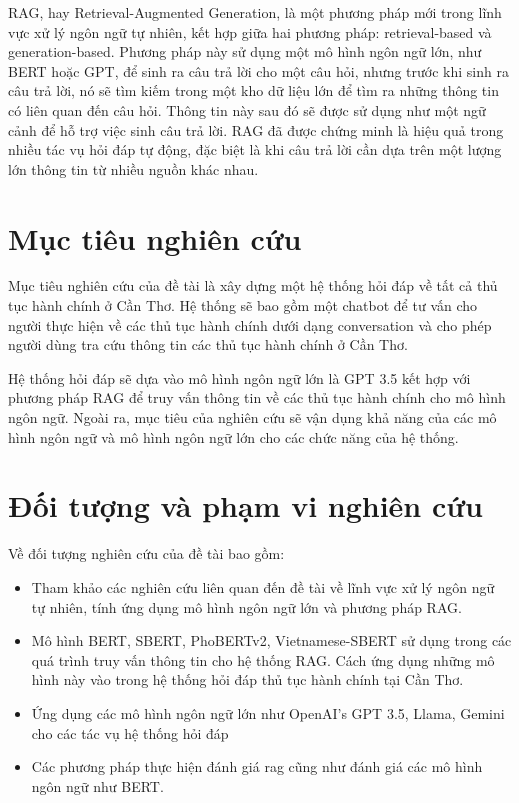 \documentclass[a4paper, 12pt, openany]{book}
\begin{document}
RAG, hay Retrieval-Augmented Generation, là một phương pháp mới trong lĩnh vực xử lý ngôn ngữ tự nhiên, kết hợp giữa hai phương pháp: retrieval-based và generation-based. 
Phương pháp này sử dụng một mô hình ngôn ngữ lớn, như BERT hoặc GPT, để sinh ra câu trả lời cho một câu hỏi, nhưng trước khi sinh ra câu trả lời, nó sẽ tìm kiếm trong một kho dữ liệu lớn để tìm ra những thông tin có liên quan đến câu hỏi. Thông tin này sau đó sẽ được sử dụng như một ngữ cảnh để hỗ trợ việc sinh câu trả lời.
RAG đã được chứng minh là hiệu quả trong nhiều tác vụ hỏi đáp tự động, đặc biệt là khi câu trả lời cần dựa trên một lượng lớn thông tin từ nhiều nguồn khác nhau. 

\section{Mục tiêu nghiên cứu}

Mục tiêu nghiên cứu của đề tài là xây dựng một hệ thống hỏi đáp về tất cả thủ tục hành chính ở Cần Thơ.
Hệ thống sẽ bao gồm một chatbot để tư vấn cho người thực hiện về các thủ tục hành chính dưới dạng conversation và cho 
phép người dùng tra cứu thông tin các thủ tục hành chính ở Cần Thơ.

Hệ thống hỏi đáp sẽ dựa vào mô hình ngôn ngữ lớn là GPT 3.5 kết hợp với phương pháp RAG
để truy vấn thông tin về các thủ tục hành chính cho mô hình ngôn ngữ. Ngoài ra, mục tiêu của nghiên cứu sẽ 
vận dụng khả năng của các mô hình ngôn ngữ và mô hình ngôn ngữ lớn cho các chức năng của hệ thống.

\section{Đối tượng và phạm vi nghiên cứu}

Về đối tượng nghiên cứu của đề tài bao gồm:
\begin{itemize}
    \item Tham khảo các nghiên cứu liên quan đến đề tài về lĩnh vực xử lý ngôn ngữ tự nhiên, tính ứng dụng mô hình ngôn ngữ lớn và phương pháp RAG.
    \item Mô hình BERT, SBERT, PhoBERTv2, Vietnamese-SBERT sử dụng trong các quá trình truy vấn thông tin cho hệ thống RAG. Cách ứng dụng những mô hình này vào trong hệ thống hỏi đáp thủ tục hành chính tại Cần Thơ.
    \item Ứng dụng các mô hình ngôn ngữ lớn như OpenAI's GPT 3.5, Llama, Gemini cho các tác vụ hệ thống hỏi đáp
    \item Các phương pháp thực hiện đánh giá \acl{rag} cũng như đánh giá các mô hình ngôn ngữ như BERT.
\end{itemize}
\end{document}
